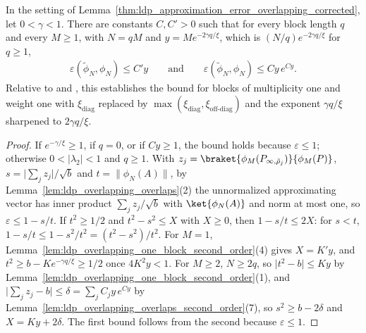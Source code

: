 \begin{lemma}
    \label{thm:ldp_approximation_error_overlapping_second_order}
    \leanok
    In the setting of Lemma~\ref{thm:ldp_approximation_error_overlapping_corrected}, let
    $0<\gamma<1$. There are constants $C,C'>0$ such that for every
    block length $q$ and every $M\ge1$, with $N=qM$ and $y=Me^{-2\gamma q/\xi}$, which is
    $(N/q)e^{-2\gamma q/\xi}$ for $q\ge1$,
    \begin{align*}
        \varepsilon(\widetilde\phi_N,\phi_N)\le C'y
        \qquad\text{and}\qquad
        \varepsilon(\widetilde\phi_N,\phi_N)\le Cy\,e^{Cy}.
    \end{align*}
    Relative to \cite[Lemma~1$'$(ii)]{Malz2024Preparation} and
    \cite{gap:mswc24_block_form_mixed_overlap}, this establishes the bound for
    blocks of multiplicity one and weight one with $\xi_{\mathrm{diag}}$ replaced by
    $\max(\xi_{\mathrm{diag}},\xi_{\mathrm{off\text{-}diag}})$ and the exponent $\gamma q/\xi$
    sharpened to $2\gamma q/\xi$.
\end{lemma}
\begin{proof}
    \leanok
    If $e^{-\gamma/\xi}\ge1$, if $q=0$, or if $Cy\ge1$, the bound holds because
    $\varepsilon\le1$; otherwise $0<\lvert\lambda_2\rvert<1$ and $q\ge1$. With
    $z_j=\braket{\phi_M(P_{\infty,\tilde\rho_j})}{\phi_M(P)}$,
    $s=\lvert\sum_jz_j\rvert/\sqrt b$ and $t=\lVert\phi_N(A)\rVert$, by
    Lemma~\ref{lem:ldp_overlapping_overlaps}(2) the unnormalized approximating vector has
    inner product $\sum_jz_j/\sqrt b$ with $\ket{\phi_N(A)}$ and norm at most one, so
    $\varepsilon\le1-s/t$. If $t^2\ge1/2$ and $t^2-s^2\le X$ with $X\ge0$, then
    $1-s/t\le2X$: for $s<t$, $1-s/t\le1-s^2/t^2=(t^2-s^2)/t^2$. For $M=1$,
    Lemma~\ref{lem:ldp_overlapping_one_block_second_order}(4) gives $X=K'y$, and
    $t^2\ge b-Ke^{-\gamma q/\xi}\ge1/2$ once $4K^2y<1$. For $M\ge2$,
    $N\ge2q$, so $\lvert t^2-b\rvert\le Ky$ by
    Lemma~\ref{lem:ldp_overlapping_one_block_second_order}(1), and
    $\lvert\sum_jz_j-b\rvert\le\delta=\sum_jC_jy\,e^{Cy}$ by
    Lemma~\ref{lem:ldp_overlapping_overlaps_second_order}(7), so $s^2\ge b-2\delta$ and
    $X=Ky+2\delta$. The first bound follows from the second because $\varepsilon\le1$.
\end{proof}
